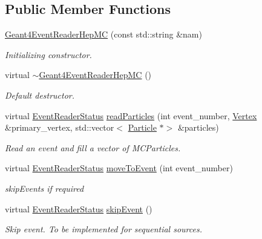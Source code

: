 \subsection*{Public Member Functions}
\begin{DoxyCompactItemize}
\item 
\hyperlink{class_d_d4hep_1_1_simulation_1_1_geant4_event_reader_hep_m_c_a265a4a6251eb9980a3a76e413c643f0c}{Geant4\+Event\+Reader\+Hep\+MC} (const std\+::string \&nam)
\begin{DoxyCompactList}\small\item\em Initializing constructor. \end{DoxyCompactList}\item 
virtual \hyperlink{class_d_d4hep_1_1_simulation_1_1_geant4_event_reader_hep_m_c_a437c86083e7da05be4821da864d8954a}{$\sim$\+Geant4\+Event\+Reader\+Hep\+MC} ()
\begin{DoxyCompactList}\small\item\em Default destructor. \end{DoxyCompactList}\item 
virtual \hyperlink{class_d_d4hep_1_1_simulation_1_1_geant4_event_reader_ae4f4bc83ffcf5b0c1868ad78859851e7}{Event\+Reader\+Status} \hyperlink{class_d_d4hep_1_1_simulation_1_1_geant4_event_reader_hep_m_c_ac2077360499585e272ced523412f025e}{read\+Particles} (int event\+\_\+number, \hyperlink{class_d_d4hep_1_1_simulation_1_1_geant4_event_reader_ac9738208fe520e5aa2ad1efa13de82e7}{Vertex} \&primary\+\_\+vertex, std\+::vector$<$ \hyperlink{class_d_d4hep_1_1_simulation_1_1_geant4_event_reader_ad37f7aa722da2299517d66b4568a6a4a}{Particle} $\ast$$>$ \&particles)
\begin{DoxyCompactList}\small\item\em Read an event and fill a vector of M\+C\+Particles. \end{DoxyCompactList}\item 
virtual \hyperlink{class_d_d4hep_1_1_simulation_1_1_geant4_event_reader_ae4f4bc83ffcf5b0c1868ad78859851e7}{Event\+Reader\+Status} \hyperlink{class_d_d4hep_1_1_simulation_1_1_geant4_event_reader_hep_m_c_a95ba8736c8274f5b24b6cd0e0b424c33}{move\+To\+Event} (int event\+\_\+number)
\begin{DoxyCompactList}\small\item\em skip\+Events if required \end{DoxyCompactList}\item 
virtual \hyperlink{class_d_d4hep_1_1_simulation_1_1_geant4_event_reader_ae4f4bc83ffcf5b0c1868ad78859851e7}{Event\+Reader\+Status} \hyperlink{class_d_d4hep_1_1_simulation_1_1_geant4_event_reader_hep_m_c_a02a4d905385f3b587ffe953e129aad5f}{skip\+Event} ()
\begin{DoxyCompactList}\small\item\em Skip event. To be implemented for sequential sources. \end{DoxyCompactList}\end{DoxyCompactItemize}
